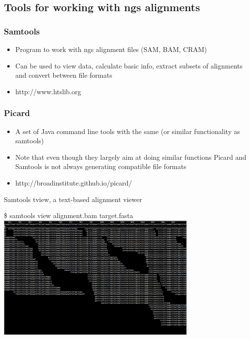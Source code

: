 \subsection{Tools for working with ngs alignments}

\begin{frame}
\frametitle{Samtools}
\begin{center}
\begin{itemize}
\item
Program to work with ngs alignment files (SAM, BAM, CRAM)
\item
Can be used to view data, calculate basic info, extract subsets of alignments and convert between file formats
\item
http://www.htslib.org
\end{itemize}
\end{center}
\end{frame}

\begin{frame}
\frametitle{Picard}
\begin{center}
\begin{itemize}
\item
A set of Java command line tools with the same (or similar functionality as samtools)
\item
Note that even though they largely aim at doing similar functions Picard and Samtools is not always generating compatible file formats
\item
http://broadinstitute.github.io/picard/
\end{itemize}
\end{center}
\end{frame}

\begin{frame}{Samtools tview, a text-based alignment viewer}
\begin{center}
\$ samtools view alignment.bam target.fasta\\
\includegraphics[width=10cm]{Images/tview.png}
\end{center}
\end{frame}

